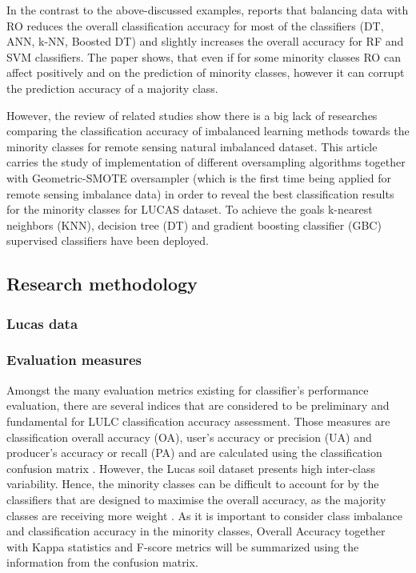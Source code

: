 \documentclass[parskip=full]{scrartcl}
\begin{document}
In the contrast to the above-discussed examples, \cite{Maxwell2018} reports
that balancing data with RO reduces the overall classification accuracy for
most of the classifiers (DT, ANN, k-NN, Boosted DT) and slightly increases the
overall accuracy for RF and SVM classifiers. The paper shows, that even if for
some minority classes RO can affect positively and on the prediction of
minority classes, however it can corrupt the prediction accuracy of a majority
class.

However, the review of related studies show there is a big lack of researches
comparing the classification accuracy of imbalanced learning methods towards the
minority classes for remote sensing natural imbalanced dataset. This article
carries the study of implementation of different oversampling algorithms
together with Geometric-SMOTE oversampler (which is the first time being applied
for remote sensing imbalance data) in order to reveal the best classification
results for the minority classes for LUCAS dataset. To achieve the goals
k-nearest neighbors (KNN), decision tree (DT) and gradient boosting classifier
(GBC) supervised classifiers have been deployed.

\subsection{Research methodology}

\subsubsection{Lucas data}


\subsubsection{Evaluation measures}
Amongst the many evaluation metrics existing for classifier's performance
evaluation, there are several indices that are considered to be preliminary and
fundamental for LULC classification accuracy assessment. Those measures are
classification overall accuracy (OA), user's accuracy or precision (UA) and
producer's accuracy or recall (PA) and are calculated using the classification
confusion matrix \cite{Liu2007}. However, the Lucas soil dataset presents high
inter-class variability. Hence, the minority classes can be difficult to
account for by the classifiers that are designed to maximise the overall
accuracy, as the majority classes are receiving more weight \cite{Inglada2017}.
As it is important to consider class imbalance and classification accuracy in
the minority classes, Overall Accuracy together with Kappa statistics and
F-score metrics will be summarized using the information from the confusion
matrix.
\end{document}
